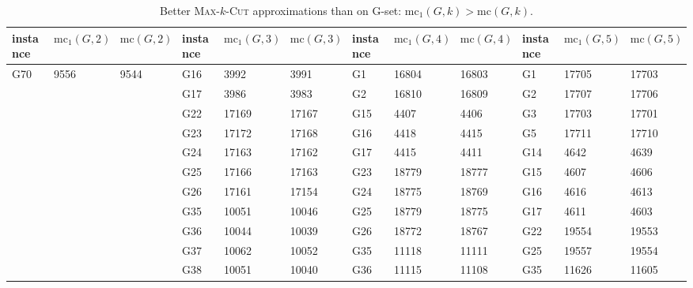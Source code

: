 \documentclass[12pt, a4paper]{article}%
\renewcommand{\arraystretch}{1.3}
\numberwithin{equation}{section}
\theoremstyle{plain}
\begin{document}
				{\scriptsize
					\setlength{\tabcolsep}{4.5pt}
					\renewcommand{\arraystretch}{1.5}
                    \begin{landscape}
					\begin{longtable}{|lll|lll|lll|lll|}
						\caption[Results for better maxcut]{Better \textsc{Max}-$k$-\textsc{Cut} approximations than \cite{Ma2015} on G-set: $\text{mc}_1(G,k)>\text{mc}(G,k)$. }
						\label{tab::maxcut-better}\\
						\hline
						instance & $\text{mc}_1(G,2)$ & $\text{mc}(G,2)$ & instance & $\text{mc}_1(G,3)$ & $\text{mc}(G,3)$ & instance & $\text{mc}_1(G,4)$ & $\text{mc}(G,4)$ & instance & $\text{mc}_1(G,5)$ & $\text{mc}(G,5)$\\ \hline
						G70      & 9556     & 9544     & G16      & 3992     & 3991     & G1       & 16804    & 16803    & G1       & 17705    & 17703    \\
						&          &          & G17      & 3986     & 3983     & G2       & 16810    & 16809    & G2       & 17707    & 17706    \\
						&          &          & G22      & 17169    & 17167    & G15      & 4407     & 4406     & G3       & 17703    & 17701    \\
						&          &          & G23      & 17172    & 17168    & G16      & 4418     & 4415     & G5       & 17711    & 17710    \\
						&          &          & G24      & 17163    & 17162    & G17      & 4415     & 4411     & G14      & 4642     & 4639     \\
						&          &          & G25      & 17166    & 17163    & G23      & 18779    & 18777    & G15      & 4607     & 4606     \\
						&          &          & G26      & 17161    & 17154    & G24      & 18775    & 18769    & G16      & 4616     & 4613     \\
						&          &          & G35      & 10051    & 10046    & G25      & 18779    & 18775    & G17      & 4611     & 4603     \\
						&          &          & G36      & 10044    & 10039    & G26      & 18772    & 18767    & G22      & 19554    & 19553    \\
						&          &          & G37      & 10062    & 10052    & G35      & 11118    & 11111    & G25      & 19557    & 19554    \\
						&          &          & G38      & 10051    & 10040    & G36      & 11115    & 11108    & G35      & 11626    & 11605    \\

\end{longtable}
\end{landscape}}
\end{document}
